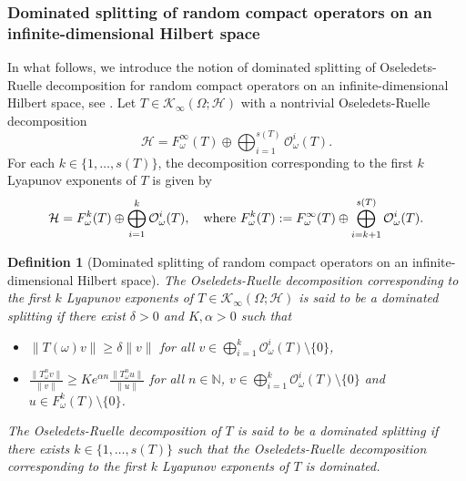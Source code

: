\documentclass[pdflatex,sn-mathphys-num]{sn-jnl}%
\theoremstyle{thmstyleone}%
\theoremstyle{thmstyletwo}%
\theoremstyle{thmstylethree}%
\newtheorem{definition}{Definition}%
\newcommand{\N}{\mathbb{N}}
\numberwithin{equation}{section}
\begin{document}
\subsubsection{Dominated splitting of random compact operators on an infinite-dimensional Hilbert space}
%
%
%
%
In what follows, we introduce the notion of dominated splitting of Oseledets-Ruelle decomposition for random compact operators on an infinite-dimensional Hilbert space, see \cite{Bessa2008}. Let $T\in \mathcal K_{\infty}(\Omega;\mathcal H)$ with a nontrivial Oseledets-Ruelle decomposition 
	\begin{equation*}
	\mathcal H= F^{\infty}_{\omega}(T)\oplus \bigoplus_{i=1}^{s(T)} \mathcal O^i_{\omega}(T).
	\end{equation*}
%
For each $k\in\{1,\dots,s(T)\}$, the decomposition corresponding to the first $k$ Lyapunov exponents of $T$ is given by 
\begin{equation}
 	\mathcal H= F^{k}_{\omega}(T)\oplus \bigoplus_{i=1}^{k} \mathcal O^i_{\omega}(T),\quad\hbox{where }  F^{k}_{\omega}(T):= F^{\infty}_{\omega}(T)\oplus \bigoplus_{i=k+1}^{s(T)} \mathcal O^i_{\omega}(T). 
\end{equation}
\begin{definition}[Dominated splitting of random compact operators on an infinite-dimensional Hilbert space]\label{Dominatedsplliting}
The Oseledets-Ruelle decomposition corresponding to the first $k$ Lyapunov exponents of $T\in  \mathcal K_{\infty}(\Omega;\mathcal H)$ is said to be a \emph{dominated splitting} if there exist $\delta>0$ and $K,\alpha>0$ such that 
\begin{itemize}
    \item [(d1)] $\|T(\omega)v\|\geq \delta \|v\|$ for all $v\in \bigoplus_{i=1}^{k} \mathcal O^i_{\omega}(T)\setminus\{0\}$,
    \item [(d2)] $\frac{\|T_{\omega}^n v\|}{\|v\|}\geq K e^{\alpha n}
    \frac{\|T_{\omega}^n u\|}{\|u\|}$ for all $n\in\N$, $v\in \bigoplus_{i=1}^{k} \mathcal O^i_{\omega}(T)\setminus\{0\}$ and $u\in F^{k}_{\omega}(T)\setminus\{0\}$.
\end{itemize}
The Oseledets-Ruelle decomposition of $T$ is said to be a \emph{dominated splitting} if there exists $k\in\{1,\dots,s(T)\}$ such that the Oseledets-Ruelle decomposition corresponding to the first $k$ Lyapunov exponents of $T$ is dominated.
\end{definition}
\end{document}
